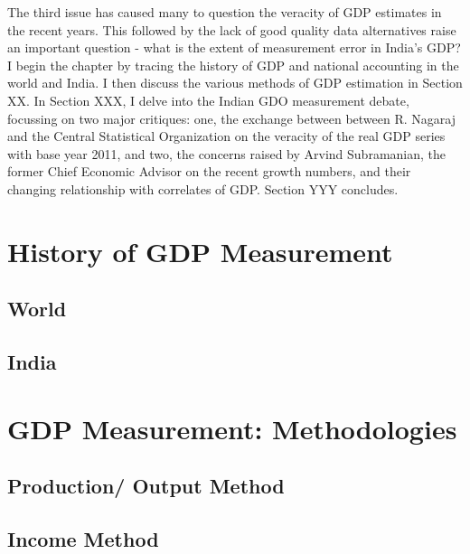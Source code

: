 \documentclass[12pt,nobind, a4paper]{reedthesis}
\begin{document}
 The third issue has caused many to question the veracity of GDP estimates in the recent years. This followed by the lack of good quality data alternatives raise an important question - what is the extent of measurement error in India's GDP? I begin the chapter by tracing the history of GDP and national accounting in the world and India. I then discuss the various methods of GDP estimation in Section XX. In Section XXX, I delve into the Indian GDO measurement debate, focussing on two major critiques: one, the exchange between between R. Nagaraj and the Central Statistical Organization on the veracity of the real GDP series with base year 2011, and two, the concerns raised by Arvind Subramanian, the former Chief Economic Advisor on the recent growth numbers, and their changing relationship with correlates of GDP. Section YYY concludes.

 \hypertarget{history-of-gdp-measurement}{%
 \section{History of GDP Measurement}\label{history-of-gdp-measurement}}

 \hypertarget{world}{%
 \subsection{World}\label{world}}

 \hypertarget{india}{%
 \subsection{India}\label{india}}

 \hypertarget{gdp-measurement-methodologies}{%
 \section{GDP Measurement: Methodologies}\label{gdp-measurement-methodologies}}

 \hypertarget{production-output-method}{%
 \subsection{Production/ Output Method}\label{production-output-method}}

 \hypertarget{income-method}{%
 \subsection{Income Method}\label{income-method}}
\end{document}
